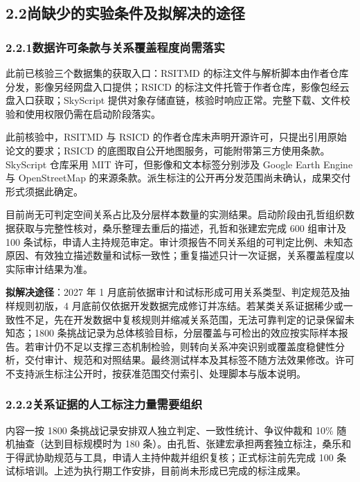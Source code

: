 \subsection*{2.2\quad 尚缺少的实验条件及拟解决的途径}

\subsubsection*{2.2.1\quad 数据许可条款与关系覆盖程度尚需落实}

此前已核验三个数据集的获取入口：RSITMD 的标注文件与解析脚本由作者仓库分发，影像另经网盘入口提供；RSICD 的标注文件托管于作者仓库，影像包经云盘入口获取；SkyScript 提供对象存储直链，核验时响应正常。完整下载、文件校验和使用权限仍需在启动阶段落实。

此前核验中，RSITMD 与 RSICD 的作者仓库未声明开源许可，只提出引用原始论文的要求；RSICD 的底图取自公开地图服务，可能附带第三方使用条款。SkyScript 仓库采用 MIT 许可，但影像和文本标签分别涉及 Google Earth Engine 与 OpenStreetMap 的来源条款。派生标注的公开再分发范围尚未确认，成果交付形式须据此确定。

目前尚无可判定空间关系占比及分层样本数量的实测结果。启动阶段由孔哲组织数据获取与完整性核对，桑乐整理去重后的描述，孔哲和张建宏完成 600 组审计及 100 条试标，申请人主持规范审定。审计须报告不同关系组的可判定比例、未知态原因、有效独立描述数量和试标一致性；重复描述只计一次证据，关系覆盖程度以实际审计结果为准。

\textbf{拟解决途径}：2027 年 1 月底前依据审计和试标形成可用关系类型、判定规范及抽样规则初版，4 月底前仅依据开发数据完成修订并冻结。若某类关系证据稀少或一致性不足，先在开发数据中复核规则并缩减关系范围，无法可靠判定的记录保留未知态；1800 条挑战记录为总体核验目标，分层覆盖与可检出的效应按实际样本报告。若审计仍不足以支撑三态机制检验，则转向关系冲突识别或覆盖度稳健性分析，交付审计、规范和对照结果。最终测试样本及其标签不随方法效果修改。许可不支持派生标注公开时，按获准范围交付索引、处理脚本与版本说明。

\subsubsection*{2.2.2\quad 关系证据的人工标注力量需要组织}

内容一按 1800 条挑战记录安排双人独立判定、一致性统计、争议仲裁和 10\% 随机抽查（达到目标规模时为 180 条）。由孔哲、张建宏承担两套独立标注，桑乐和于得武协助规范与工具，申请人主持仲裁并组织复核；正式标注前先完成 100 条试标培训。上述为执行期工作安排，目前尚未形成已完成的标注成果。

